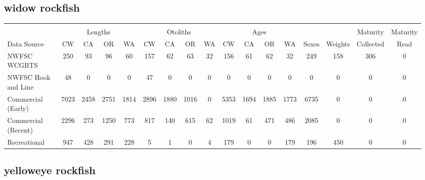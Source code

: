 \documentclass[12pt,]{article}
\begin{document}
\FloatBarrier  

\subsection{widow rockfish}\label{widow-rockfish}

\begin{table}[ht]
\centering
\begingroup\fontsize{10pt}{10pt}\selectfont
\begin{tabular}{|l|cccc|cccc|cccc|c|c|c|c|}
  \hline
 &  &  &  &  &  &  &  &  &  &  &  &  &  &  &  &  \\ 
   & \multicolumn{4}{c}{Lengths} &  \multicolumn{4}{c}{Otoliths} & \multicolumn{4}{c}{Ages} &  & & Maturity & Maturity\\
 Data Source & CW & CA & OR & WA & CW & CA & OR & WA & CW & CA & OR & WA & Sexes & Weights & Collected & Read\\
 \hline
NWFSC WCGBTS & 250 & 93 & 96 & 60 & 157 & 62 & 63 & 32 & 156 & 61 & 62 & 32 & 249 & 158 & 306 & 0 \\ 
  NWFSC Hook and Line & 48 & 0 & 0 & 0 & 47 & 0 & 0 & 0 & 0 & 0 & 0 & 0 & 0 & 0 & 0 & 0 \\ 
  Commercial (Early) & 7023 & 2458 & 2751 & 1814 & 2896 & 1880 & 1016 & 0 & 5353 & 1694 & 1885 & 1773 & 6735 & 0 & 0 & 0 \\ 
  Commercial (Recent) & 2296 & 273 & 1250 & 773 & 817 & 140 & 615 & 62 & 1019 & 61 & 471 & 486 & 2085 & 0 & 0 & 0 \\ 
  Recreational & 947 & 428 & 291 & 228 & 5 & 1 & 0 & 4 & 179 & 0 & 0 & 179 & 196 & 450 & 0 & 0 \\ 
   \hline
\end{tabular}
\endgroup
\end{table}

\FloatBarrier  

\subsection{yelloweye rockfish}\label{yelloweye-rockfish}
\end{document}
